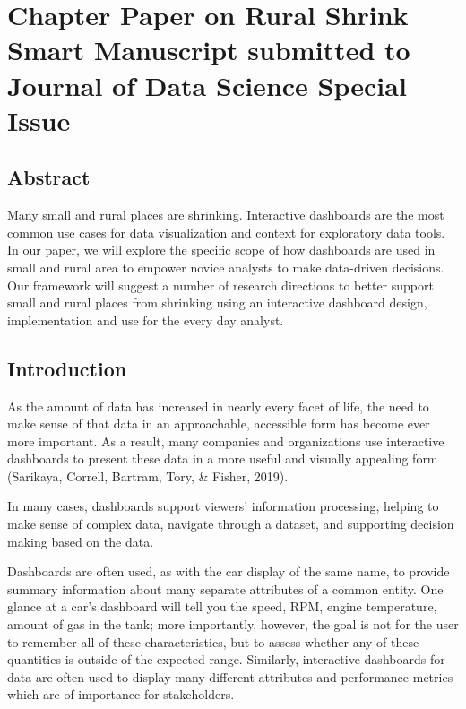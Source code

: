 \documentclass[print]{nuthesis}
\begin{document}
\hypertarget{rmd-basics}{%
\chapter{Chapter Paper on Rural Shrink Smart Manuscript submitted to Journal of Data Science Special Issue}\label{rmd-basics}}

\hypertarget{abstract}{%
\section{Abstract}\label{abstract}}

Many small and rural places are shrinking. Interactive dashboards are the most common use cases for data visualization and context for exploratory data tools. In our paper, we will explore the specific scope of how dashboards are used in small and rural area to empower novice analysts to make data-driven decisions. Our framework will suggest a number of research directions to better support small and rural places from shrinking using an interactive dashboard design, implementation and use for the every day analyst.

\hypertarget{introduction-1}{%
\section{Introduction}\label{introduction-1}}

As the amount of data has increased in nearly every facet of life, the need to make sense of that data in an approachable, accessible form has become ever more important.
As a result, many companies and organizations use interactive dashboards to present these data in a more useful and visually appealing form (Sarikaya, Correll, Bartram, Tory, \& Fisher, 2019).

In many cases, dashboards support viewers' information processing, helping to make sense of complex data, navigate through a dataset, and supporting decision making based on the data.

Dashboards are often used, as with the car display of the same name, to provide summary information about many separate attributes of a common entity. One glance at a car's dashboard will tell you the speed, RPM, engine temperature, amount of gas in the tank; more importantly, however, the goal is not for the user to remember all of these characteristics, but to assess whether any of these quantities is outside of the expected range.
Similarly, interactive dashboards for data are often used to display many different attributes and performance metrics which are of importance for stakeholders.
\end{document}
